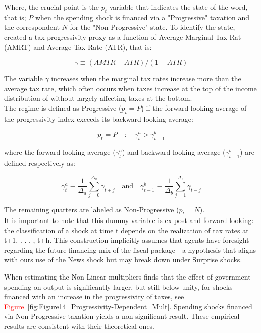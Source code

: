 \documentclass[12pt,letterpaper]{article}
\begin{document}
Where, the crucial point is the $p_t$ variable that indicates the state of the word, that is; $P$ when the spending shock is financed via a "Progressive" taxation and the correspondent $N$ for the "Non-Progressive" state.
To identify the state, \cite{FN} created a tax progressivity proxy as a function of  Average Marginal Tax Rat (AMRT) and Average Tax Rate (ATR), that is:

\begin{equation}
    \gamma \equiv (AMTR - ATR)/(1-ATR)
    \label{eq:Gamma_FN}
\end{equation}

The variable $\gamma$ increases when the marginal tax rates increase more than the average tax rate, which often occurs when taxes increase at the top of the income distribution of without largely affecting taxes at the bottom.
\\
The regime is defined as Progressive ($p_t = P$) if the forward-looking average of the progressivity index exceeds its backward-looking average:

\begin{equation}
    p_t = P \quad : \quad \gamma^a_t > \gamma^b_{t-1}
\end{equation}

where the forward-looking average ($\gamma^a_t$) and backward-looking average ($\gamma^b_{t-1}$) are defined respectively as:

\begin{equation}
    \gamma^a_t \equiv \frac{1}{\Delta_a} \sum_{j=0}^{\Delta_a} \gamma_{t+j} \quad \text{and} \quad \gamma^b_{t-1} \equiv \frac{1}{\Delta_b} \sum_{j=1}^{\Delta_b} \gamma_{t-j}
\end{equation}

The remaining quarters are labeled as Non-Progressive ($p_t = N$).
\\
It is important to note that this dummy variable is
ex-post and forward-looking: the classification of a shock at time t depends on the
realization of tax rates at t+1, . . . , t+h. This construction implicitly assumes that agents
have foresight regarding the future financing mix of the fiscal package—a hypothesis that
aligns with ours use of the News shock but may break down under Surprise shocks.


When estimating the Non-Linear multipliers \cite{FN} finds that the effect of government spending on output is significantly larger, but still below unity, for shocks financed with an increase in the progressivity of taxes, see \textcolor{red}{Figure~\ref{fig:Figure14_Progressivity-Dependent_Mult}}. Spending shocks financed via Non-Progressive taxation yields a non significant result.
These empirical results are consistent with their theoretical ones.
\end{document}
